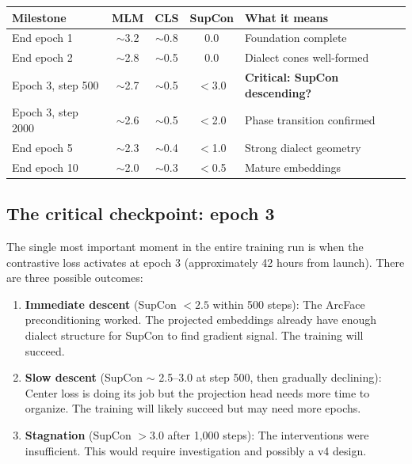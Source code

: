 \documentclass[11pt,a4paper]{article}
\theoremstyle{definition}
\begin{document}
\begin{center}
\renewcommand{\arraystretch}{1.3}
\begin{tabular}{l ccc l}
\toprule
\textbf{Milestone} & \textbf{MLM} & \textbf{CLS} & \textbf{SupCon}
& \textbf{What it means} \\
\midrule
End epoch 1 & $\sim$3.2 & $\sim$0.8 & 0.0 &
  Foundation complete \\
End epoch 2 & $\sim$2.8 & $\sim$0.5 & 0.0 &
  Dialect cones well-formed \\
Epoch 3, step 500 & $\sim$2.7 & $\sim$0.5 & $<$3.0 &
  \textbf{Critical: SupCon descending?} \\
Epoch 3, step 2000 & $\sim$2.6 & $\sim$0.5 & $<$2.0 &
  Phase transition confirmed \\
End epoch 5 & $\sim$2.3 & $\sim$0.4 & $<$1.0 &
  Strong dialect geometry \\
End epoch 10 & $\sim$2.0 & $\sim$0.3 & $<$0.5 &
  Mature embeddings \\
\bottomrule
\end{tabular}
\end{center}

\subsection{The critical checkpoint: epoch 3}

The single most important moment in the entire training run is when
the contrastive loss activates at epoch 3 (approximately 42 hours
from launch). There are three possible outcomes:

\begin{enumerate}
  \item \textbf{Immediate descent} (SupCon $< 2.5$ within 500 steps):
    The ArcFace preconditioning worked. The projected embeddings
    already have enough dialect structure for SupCon to find gradient
    signal. The training will succeed.

  \item \textbf{Slow descent} (SupCon $\sim$ 2.5--3.0 at step 500, then
    gradually declining): Center loss is doing its job but the
    projection head needs more time to organize. The training will
    likely succeed but may need more epochs.

  \item \textbf{Stagnation} (SupCon $> 3.0$ after 1,000 steps): The
    interventions were insufficient. This would require investigation
    and possibly a v4 design.
\end{enumerate}
\end{document}
